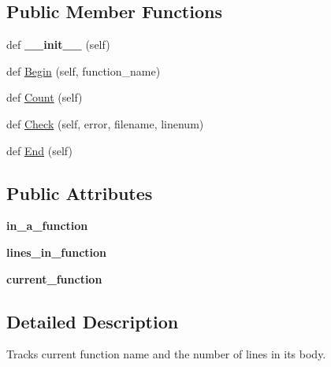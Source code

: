 \subsection*{Public Member Functions}
\begin{DoxyCompactItemize}
\item 
def {\bfseries \+\_\+\+\_\+init\+\_\+\+\_\+} (self)\hypertarget{classcpplint_1_1__FunctionState_a3f6a865710852cc74c6a7085180458ae}{}\label{classcpplint_1_1__FunctionState_a3f6a865710852cc74c6a7085180458ae}

\item 
def \hyperlink{classcpplint_1_1__FunctionState_a41215c4d73baccbb340f6d0df1c1f4b3}{Begin} (self, function\+\_\+name)
\item 
def \hyperlink{classcpplint_1_1__FunctionState_ac25c9711911ae181b091b52619cf2701}{Count} (self)
\item 
def \hyperlink{classcpplint_1_1__FunctionState_a5e4ad7d7b104038b45204ab4abf527b2}{Check} (self, error, filename, linenum)
\item 
def \hyperlink{classcpplint_1_1__FunctionState_a1ab6b0a575c25c135f9004b7fb12dc4a}{End} (self)
\end{DoxyCompactItemize}
\subsection*{Public Attributes}
\begin{DoxyCompactItemize}
\item 
{\bfseries in\+\_\+a\+\_\+function}\hypertarget{classcpplint_1_1__FunctionState_a8362d472591f60462184bf68b49c0efb}{}\label{classcpplint_1_1__FunctionState_a8362d472591f60462184bf68b49c0efb}

\item 
{\bfseries lines\+\_\+in\+\_\+function}\hypertarget{classcpplint_1_1__FunctionState_a886f5d476adc81f499a711750a399aa2}{}\label{classcpplint_1_1__FunctionState_a886f5d476adc81f499a711750a399aa2}

\item 
{\bfseries current\+\_\+function}\hypertarget{classcpplint_1_1__FunctionState_a320674f54bd75087febc8f0d83620569}{}\label{classcpplint_1_1__FunctionState_a320674f54bd75087febc8f0d83620569}

\end{DoxyCompactItemize}


\subsection{Detailed Description}
\begin{DoxyVerb}Tracks current function name and the number of lines in its body.\end{DoxyVerb}
 


